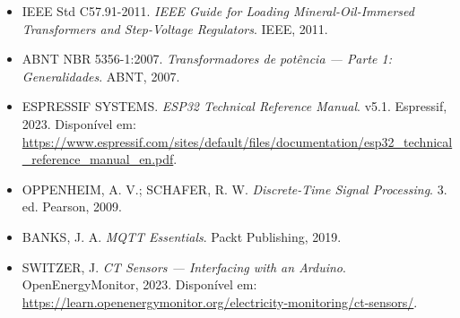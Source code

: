 \documentclass[12pt, a4paper]{article}
\begin{document}
\begin{itemize}[leftmargin=2cm, itemsep=4pt]
    \item IEEE Std C57.91-2011. \textit{IEEE Guide for Loading Mineral-Oil-Immersed Transformers and Step-Voltage Regulators}. IEEE, 2011.
    \item ABNT NBR 5356-1:2007. \textit{Transformadores de potência --- Parte 1: Generalidades}. ABNT, 2007.
    \item ESPRESSIF SYSTEMS. \textit{ESP32 Technical Reference Manual}. v5.1. Espressif, 2023. Disponível em: \url{https://www.espressif.com/sites/default/files/documentation/esp32_technical_reference_manual_en.pdf}.
    \item OPPENHEIM, A. V.; SCHAFER, R. W. \textit{Discrete-Time Signal Processing}. 3. ed. Pearson, 2009.
    \item BANKS, J. A. \textit{MQTT Essentials}. Packt Publishing, 2019.
    \item SWITZER, J. \textit{CT Sensors --- Interfacing with an Arduino}. OpenEnergyMonitor, 2023. Disponível em: \url{https://learn.openenergymonitor.org/electricity-monitoring/ct-sensors/}.
\end{itemize}
\end{document}
